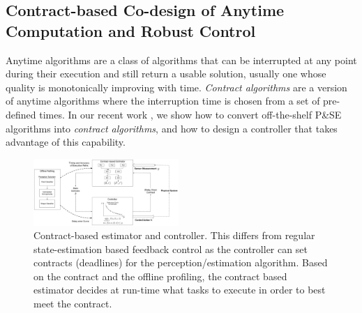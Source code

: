 \subsection{Contract-based Co-design of Anytime Computation and Robust Control}
Anytime algorithms \cite{boddy} are a class of algorithms that can be interrupted at any point during their execution and still return a usable solution, usually one whose quality is monotonically improving with time. 
\emph{Contract algorithms} \cite{zilbersteinAImag} are a version of anytime algorithms where the interruption time is chosen from a set of pre-defined times. 
In our recent work \cite{RTSS15, Complex15}, we show how to convert off-the-shelf P\&SE algorithms into \emph{contract algorithms}, and how to design a controller that takes advantage of this capability.

\begin{figure}[t]
	\centering
	\includegraphics[width=0.49\textwidth]{Figures/process_figure2.pdf}
	\caption{Contract-based estimator and controller. This differs from regular state-estimation based feedback control as the controller can set contracts (deadlines) for the perception/estimation algorithm. Based on the contract and the offline profiling, the contract based estimator decides at run-time what tasks to execute in order to best meet the contract.}
	\label{fig:fullcodesignedCE}
	\vspace{-10pt}
\end{figure}

